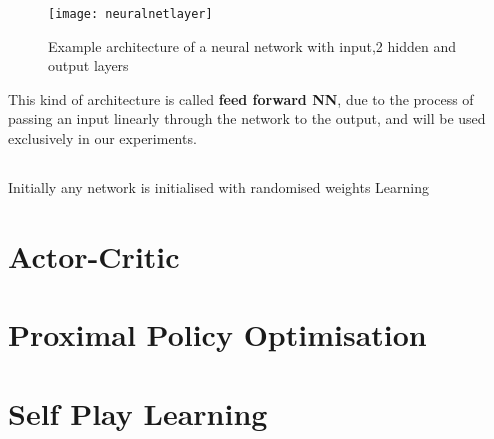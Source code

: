 \begin{figure}[]
    \centering
    \texttt{[image: neuralnetlayer]}
    \caption{Example architecture of a neural network with input,2 hidden and output layers}
    \label{fig:architecture}
\end{figure}
This kind of architecture is called \textbf{feed forward NN}, due to the process of passing an input linearly through
the network to the output, and will be used exclusively in our experiments.\\

\subsection{}
Initially any network is initialised with randomised weights
Learning


\section{Actor-Critic}


\section{Proximal Policy Optimisation}


\section{Self Play Learning}
